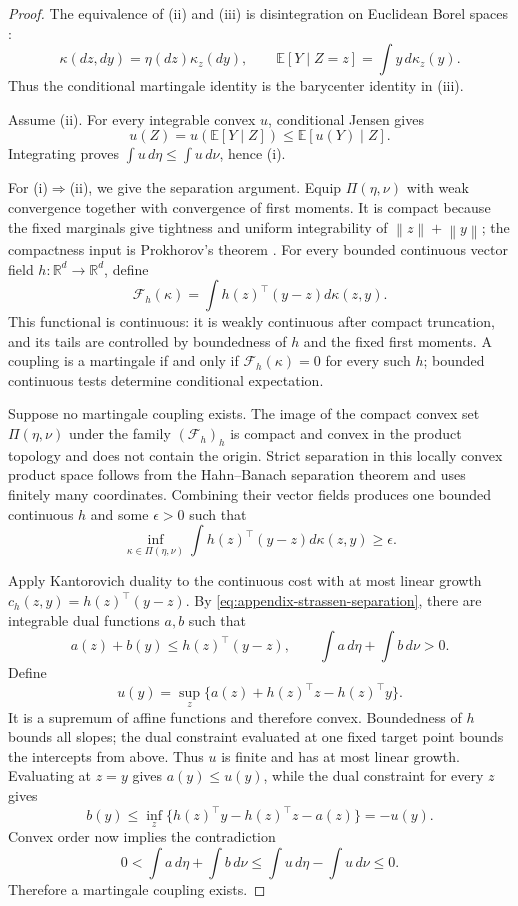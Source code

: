 \documentclass[11pt]{article}
\newcommand{\R}{\mathbb R}
\newcommand{\E}{\mathbb E}
\newcommand{\norm}[1]{\left\lVert #1\right\rVert}
\theoremstyle{plain}
\theoremstyle{definition}
\theoremstyle{remark}
\begin{document}
\begin{proof}
The equivalence of (ii) and (iii) is disintegration on Euclidean Borel spaces
\cite[Theorem~3.4]{Kallenberg}:
\[
 \kappa(dz,dy)=\eta(dz)\kappa_z(dy),
 \qquad \E[Y\mid Z=z]=\int y\,d\kappa_z(y).
\]
Thus the conditional martingale identity is the barycenter identity in
(iii).

Assume (ii).  For every integrable convex $u$, conditional Jensen gives
\[
 u(Z)=u(\E[Y\mid Z])\le\E[u(Y)\mid Z].
\]
Integrating proves $\int u\,d\eta\le\int u\,d\nu$, hence (i).

For (i)$\Rightarrow$(ii), we give the separation argument.  Equip
$\Pi(\eta,\nu)$ with weak convergence together with convergence of first moments.
It is compact because the fixed marginals give tightness and uniform integrability
of $\norm z+\norm y$; the compactness input is Prokhorov's theorem
\cite[Theorem~5.1]{Billingsley}.  For every bounded continuous vector field
$h:\R^d\to\R^d$, define
\[
 \mathcal F_h(\kappa)=\int h(z)^\top(y-z)d\kappa(z,y).
\]
This functional is continuous: it is weakly continuous after compact truncation,
and its tails are controlled by boundedness of $h$ and the fixed first moments.  A
coupling is a martingale if and only if $\mathcal F_h(\kappa)=0$ for every such
$h$; bounded continuous tests determine conditional expectation.

Suppose no martingale coupling exists.  The image of the compact convex set
$\Pi(\eta,\nu)$ under the family $(\mathcal F_h)_h$ is compact and convex in the
product topology and does not contain the origin.  Strict separation in this locally
convex product space follows from the Hahn--Banach separation theorem
\cite[Chapter~1]{BrezisFA} and uses finitely many coordinates.  Combining their vector fields
produces one bounded continuous $h$ and some $\epsilon>0$ such that
\begin{equation}\label{eq:appendix-strassen-separation}
 \inf_{\kappa\in\Pi(\eta,\nu)}
 \int h(z)^\top(y-z)d\kappa(z,y)\ge\epsilon.
\end{equation}

Apply Kantorovich duality \cite[Theorem~5.10]{VillaniOT} to the continuous cost with
at most linear growth
$c_h(z,y)=h(z)^\top(y-z)$.  By
\eqref{eq:appendix-strassen-separation}, there are integrable dual functions $a,b$
such that
\[
 a(z)+b(y)\le h(z)^\top(y-z),\qquad
 \int a\,d\eta+\int b\,d\nu>0.
\]
Define
\[
 u(y)=\sup_z\{a(z)+h(z)^\top z-h(z)^\top y\}.
\]
It is a supremum of affine functions and therefore convex.  Boundedness of $h$
bounds all slopes; the dual constraint evaluated at one fixed target point bounds the
intercepts from above.  Thus $u$ is finite and has at most linear growth.  Evaluating
at $z=y$ gives $a(y)\le u(y)$, while the dual constraint for every $z$ gives
\[
 b(y)\le\inf_z\{h(z)^\top y-h(z)^\top z-a(z)\}=-u(y).
\]
Convex order now implies the contradiction
\[
 0<\int a\,d\eta+\int b\,d\nu
 \le\int u\,d\eta-\int u\,d\nu\le0.
\]
Therefore a martingale coupling exists.
\end{proof}
\end{document}
